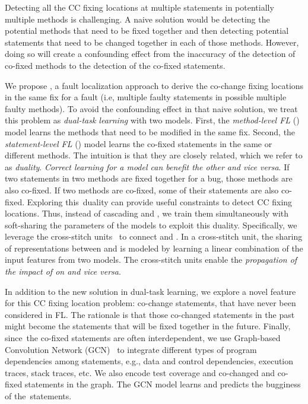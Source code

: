 Detecting all the CC fixing locations at multiple statements in
potentially multiple methods is challenging. A naive solution would be
detecting the potential methods that need to be fixed together and
then detecting potential statements that need to be changed together
in each of those methods. However, doing so will create a confounding
effect from the inaccuracy of the detection of co-fixed methods to the
detection of the co-fixed statements.

We propose {\tool}, a fault localization approach to derive the
co-change fixing locations in the same fix for a fault (i.e, multiple
faulty statements in possible multiple faulty methods).
To avoid the confounding effect in that naive solution, we treat this
problem as {\em dual-task learning} with two models. First, the {\em
  method-level FL} () model learns the methods that need
to be modified in the same fix. Second, the {\em statement-level FL}
() model learns the co-fixed statements in the same or
different methods. The intuition is that they are closely related,
which we refer to as {\em duality}. {\em Correct learning for a model
  can benefit the other and vice versa}. If two statements in two
methods are fixed together for a bug, those methods are also
co-fixed. If two methods are co-fixed, some of their statements are
also co-fixed. Exploring this~duality can provide useful constraints
to detect CC fixing locations. Thus, instead of
cascading  and , we train them
simultaneously with soft-sharing the parameters of the models to
exploit this duality. Specifically, we leverage the cross-stitch
units~\cite{misra2016cross} to connect  and
. In a cross-stitch unit, the sharing of representations
between  and  is modeled by learning a
linear combination of the input features from two models. The
cross-stitch units enable the {\em propagation of the impact of
   on  and vice versa}.


In addition to the new solution in dual-task learning, we explore a
novel feature for this CC fixing location problem: co-change
statements, that have never been considered in FL. The rationale is
that those co-changed statements in the past might become the
statements that will be fixed together in the future. Finally,
since~the co-fixed statements are often interdependent, we use
Graph-based Convolution Network (GCN)~\cite{li2019gcn} to integrate
different types of program dependencies among statements, e.g., data
and control dependencies, execution traces, stack traces, etc. We
also encode test coverage and co-changed and co-fixed statements in
the graph. The GCN model learns and predicts the bugginess of
the~statements.

